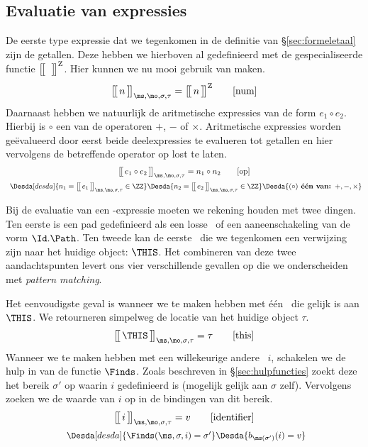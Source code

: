 \subsection{Evaluatie van expressies}

De eerste type expressie dat we tegenkomen in de definitie van §\ref{sec:formeletaal} zijn de getallen. Deze hebben we hierboven al gedefinieerd met de gespecialiseerde functie $\Express[Z]{\;}{}$. Hier kunnen we nu mooi gebruik van maken.
%
\begin{equation*}
  \Express{n}{\ms,\mo,\sigma,\tau} = \Express[Z]{n}{}
  \tag*{[num]}
\end{equation*}
%
Daarnaast hebben we natuurlijk de aritmetische expressies van de form $e_1 \circ e_2$. Hierbij is $\circ$ een van de operatoren $+$, $-$ of $\times$. Aritmetische expressies worden geëvalueerd door eerst beide deelexpressies te evalueren tot getallen en hier vervolgens de betreffende operator op lost te laten.
%
\begin{gather*}
  \Express{e_1 \circ e_2}{\ms,\mo,\sigma,\tau} = n_1 \circ n_2
  \tag*{[op]} \\
  \Desdas{
    \Desda[desda]{n_1 = \Express{e_1}{\ms,\mo,\sigma,\tau} \in \ZZ}
    \Desda{n_2 = \Express{e_2}{\ms,\mo,\sigma,\tau} \in \ZZ}
    \Desda{(\circ) \textbf{ één van: } +, -, \times}
  }
\end{gather*}

Bij de evaluatie van een \Path-expressie moeten we rekening houden met twee dingen. Ten eerste is een pad gedefinieerd als een losse \Id\ of een aaneenschakeling van de vorm $\Id.\Path$. Ten tweede kan de eerste \Id\ die we tegenkomen een verwijzing zijn naar het huidige object: $\THIS$. Het combineren van deze twee aandachtspunten levert ons vier verschillende gevallen op die we onderscheiden met \emph{pattern matching}.

Het eenvoudigste geval is wanneer we te maken hebben met één \Id\ die gelijk is aan $\THIS$. We retourneren simpelweg de locatie van het huidige object $\tau$.
%
\begin{equation*}
  \Express{\THIS}{\ms,\mo,\sigma,\tau} = \tau
  \tag*{[this]}
\end{equation*}
%
Wanneer we te maken hebben met een willekeurige andere \Id\ $i$, schakelen we de hulp in van de functie $\Finds$. Zoals beschreven in §\ref{sec:hulpfuncties} zoekt deze het bereik $\sigma'$ op waarin $i$ gedefinieerd is (mogelijk gelijk aan $\sigma$ zelf). Vervolgens zoeken we de waarde van $i$ op in de bindingen van dit bereik.
%
\begin{gather*}
  \Express{i}{\ms,\mo,\sigma,\tau} = v
  \tag*{[identifier]}\label{rul:identifier} \\
  \Desdas{
    \Desda[desda]{\Finds(\ms, \sigma, i) = \sigma'}
    \Desda{b_{\ms(\sigma')}(i) = v}
  }
\end{gather*}

